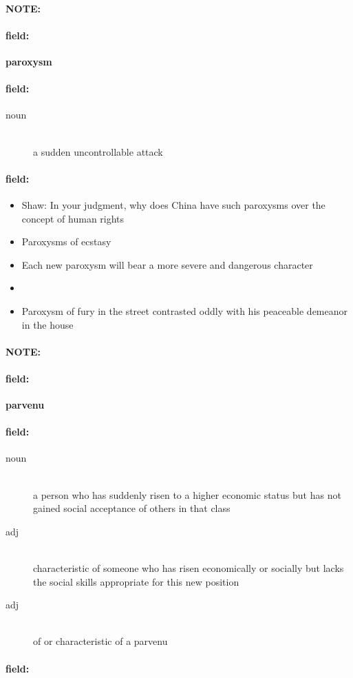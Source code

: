\documentclass[12pt]{article}
\newenvironment{note}{\paragraph{NOTE:}}{}
\newenvironment{field}{\paragraph{field:}}{}
\begin{document}
\begin{note}
\begin{field}
\textbf{\large paroxysm}
\end{field}


\begin{field}
\begin{description}
\item[noun] \hfill \\ 
a sudden uncontrollable attack

\end{description}
\end{field}

\begin{field}
\begin{itemize}
\item Shaw: In your judgment, why does China have such paroxysms over the concept of human rights
\item Paroxysms of ecstasy
\item Each new paroxysm will bear a more severe and dangerous character
\item 
\item Paroxysm of fury in the street contrasted oddly with his peaceable demeanor in the house
\end{itemize}
\end{field}
\end{note}
\begin{note}
\begin{field}
\textbf{\large parvenu}
\end{field}


\begin{field}
\begin{description}
\item[noun] \hfill \\ 
a person who has suddenly risen to a higher economic status but has not gained social acceptance of others in that class

\item[adj] \hfill \\ 
characteristic of someone who has risen economically or socially but lacks the social skills appropriate for this new position

\item[adj] \hfill \\ 
of or characteristic of a parvenu

\end{description}
\end{field}

\begin{field}
\end{field}
\end{note}
\end{document}
